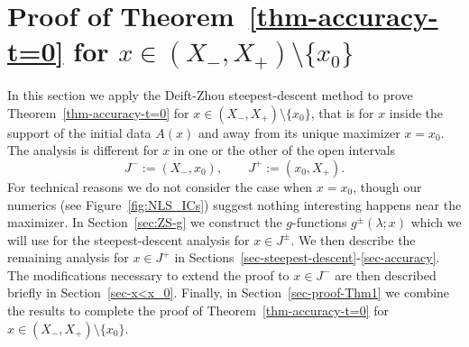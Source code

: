 \documentclass[12pt]{amsart}
\numberwithin{equation}{section}
\newcommand{\SP}{\lambda}
\begin{document}
\section{Proof of Theorem~\ref{thm-accuracy-t=0} for $x\in (X_-,X_+)\setminus\{x_0\}$}
\label{sec-zakharov-shabat}
In this section we apply the Deift-Zhou steepest-descent method to prove Theorem~\ref{thm-accuracy-t=0} for $x \in (X_-, X_+) \setminus \{ x_0 \} $, that is for $x$ inside the support of the initial data $A(x)$ and away from its unique maximizer $x=x_0$. 
The analysis is different for $x$ in one or the other of the open intervals
\begin{equation}
	J^- := (X_-, x_0), \qquad J^+ := (x_0, X_+).
\end{equation}
For technical reasons we do not consider the case when $x = x_0$, though our numerics (see Figure~\ref{fig:NLS_ICs}) suggest nothing interesting happens near the maximizer. 
In Section~\ref{sec:ZS-g} we construct the $g$-functions $g^\pm(\SP;x)$ which we will use for the steepest-descent analysis for $x \in J^\pm$. We then describe the remaining analysis for $x \in J^+$ in Sections~\ref{sec-steepest-descent}-\ref{sec-accuracy}. The modifications necessary to extend the proof to $x \in J^-$ are then described briefly in Section~\ref{sec-x<x_0}. Finally, in Section~\ref{sec-proof-Thm1} we combine the results to complete the proof of Theorem~\ref{thm-accuracy-t=0} for $x\in (X_-,X_+)\setminus\{x_0\}$.
\end{document}
